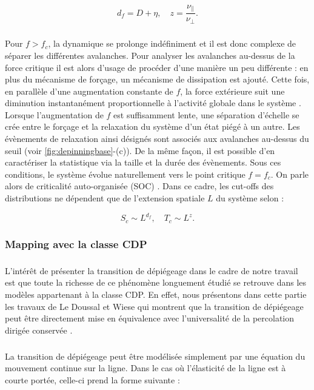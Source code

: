\begin{equation}
	d_f = D + \eta, \quad z = \frac{\nu_\parallel}{\nu_\perp}.
\end{equation}

\subparagraph{}Pour $f>f_c$, la dynamique se prolonge indéfiniment et il est donc complexe de séparer les différentes avalanches. Pour analyser les avalanches au-dessus de la force critique il est alors d'usage de procéder d'une manière un peu différente : en plus du mécanisme de forçage, un mécanisme de dissipation est ajouté. Cette fois, en parallèle d'une augmentation constante de $f$, la force extérieure suit une diminution instantanément proportionnelle à l'activité globale dans le système \cite{le_priol_long_range_2020, wiese_theory_2022}. Lorsque l'augmentation de $f$ est suffisamment lente, une séparation d'échelle se crée entre le forçage et la relaxation du système d'un état piégé à un autre. Les évènements de relaxation ainsi désignés sont associés aux avalanches au-dessus du seuil (voir \autoref{fig:depinningbase}-(c)). De la même façon, il est possible d'en caractériser la statistique via la taille et la durée des évènements. Sous ces conditions, le système évolue naturellement vers le point critique $f=f_c$. On parle alors de criticalité auto-organisée (SOC) \cite{bak_self_organized_1988, turcotte_self_organized_1999, lubeck_universal_2004}. Dans ce cadre, les cut-offs des distributions ne dépendent que de l'extension spatiale $L$ du système selon :

\begin{equation}
	S_c \sim L^{d_f}, \quad T_c \sim L^{z}.
\end{equation}

\subsubsection{Mapping avec la classe CDP}

\label{sec:mapping_dep_cdp}

\subparagraph{}L'intérêt de présenter la transition de dépiégeage dans le cadre de notre travail est que toute la richesse de ce phénomène longuement étudié se retrouve dans les modèles appartenant à la classe CDP. En effet, nous présentons dans cette partie les travaux de Le Doussal et Wiese qui montrent que la transition de dépiégeage peut être directement mise en équivalence avec l'universalité de la percolation dirigée conservée \cite{le_doussal_exact_2015, wiese_hyperuniformity_2024}.

\subparagraph{}La transition de dépiégeage peut être modélisée simplement par une équation du mouvement continue sur la ligne. Dans le cas où l'élasticité de la ligne est à courte portée, celle-ci prend la forme suivante \cite{fisher_collective_1998, wiese_theory_2022} :

